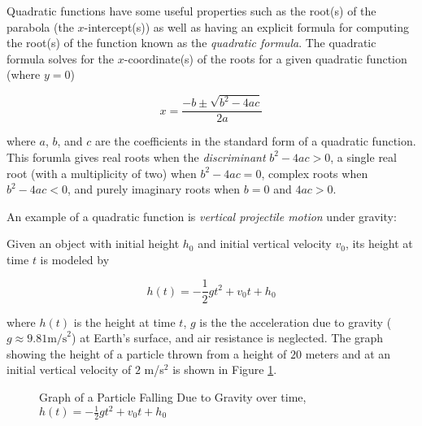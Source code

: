 Quadratic functions have some useful properties such as the root(s) of the parabola (the $x$-intercept(s)) as well as having an explicit formula for computing the root(s) of the function known as the \textit{quadratic formula}. The quadratic formula solves for the $x$-coordinate(s) of the roots for a given quadratic function (where $y=0$)

\begin{equation}
    x = \frac{-b \pm \sqrt{b^2 - 4ac}}{2a}
\end{equation}

\noindent where $a$, $b$, and $c$ are the coefficients in the standard form of a quadratic function. This forumla gives real roots when the \textit{discriminant} $b^2 - 4ac > 0$, a single real root (with a multiplicity of two) when $b^2 - 4ac = 0$, complex roots when $b^2 - 4ac < 0$, and purely imaginary roots when $b = 0$ and $4ac > 0$.

\begin{example}
    An example of a quadratic function is \textit{vertical projectile motion} under gravity:

    \noindent Given an object with initial height $h_0$ and initial vertical velocity $v_0$, its height at time $t$ is modeled by

    $$
    h(t) = -\frac{1}{2}gt^2 + v_0 t + h_0
    $$

    \noindent where $h(t)$ is the height at time $t$, $g$ is the the acceleration due to gravity ($g \approx 9.81 \text{m/s}^2$) at Earth's surface, and air resistance is neglected. The graph showing the height of a particle thrown from a height of $20$ meters and at an initial vertical velocity of $2$ m/s$^2$ is shown in Figure \ref{ballistictrajectory}.

    \begin{figure}[!ht]
        \centering
        \label{ballistictrajectory}
        \caption{Graph of a Particle Falling Due to Gravity over time, $h(t) = -\frac{1}{2}gt^2 + v_0 t + h_0$}
    \end{figure}
\end{example}

